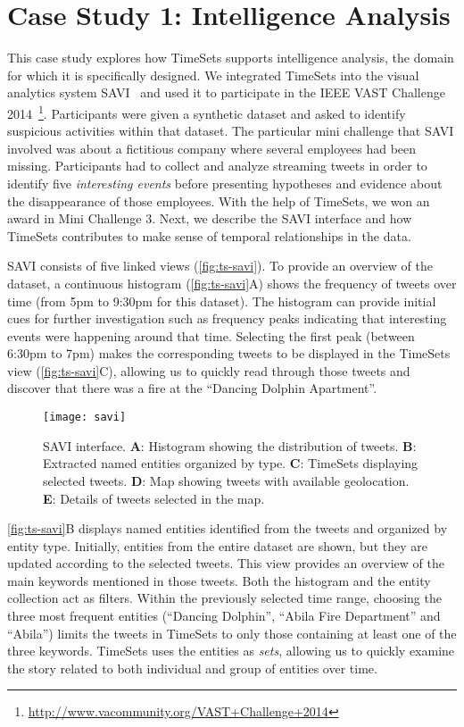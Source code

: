 \section{Case Study 1: Intelligence Analysis}
\label{sub:ts-vast}
This case study explores how TimeSets supports intelligence analysis, the domain for which it is specifically designed. We integrated TimeSets into the visual analytics system SAVI~\cite{Xu2014} and used it to participate in the IEEE VAST Challenge 2014~\footnote{\url{http://www.vacommunity.org/VAST+Challenge+2014}}. Participants were given a synthetic dataset and asked to identify suspicious activities within that dataset. The particular mini challenge that SAVI involved was about a fictitious company where several employees had been missing. Participants had to collect and analyze streaming tweets in order to identify five \emph{interesting events} before presenting hypotheses and evidence about the disappearance of those employees. With the help of TimeSets, we won an award in Mini Challenge 3. Next, we describe the SAVI interface and how TimeSets contributes to make sense of temporal relationships in the data.

SAVI consists of five linked views (\autoref{fig:ts-savi}). To provide an overview of the dataset, a continuous histogram (\autoref{fig:ts-savi}A) shows the frequency of tweets over time (from 5pm to 9:30pm for this dataset). The histogram can provide initial cues for further investigation such as frequency peaks indicating that interesting events were happening around that time. Selecting the first peak (between 6:30pm to 7pm) makes the corresponding tweets to be displayed in the TimeSets view (\autoref{fig:ts-savi}C), allowing us to quickly read through those tweets and discover that there was a fire at the ``Dancing Dolphin Apartment''.

\begin{figure}[p]
	\centering
	\texttt{[image: savi]}
	\caption[SAVI interface]{SAVI interface. \textbf{A}: Histogram showing the distribution of tweets. \textbf{B}: Extracted named entities organized by type. \textbf{C}: TimeSets displaying selected tweets. \textbf{D}: Map showing tweets with available geolocation. \textbf{E}: Details of tweets selected in the map.}
	\label{fig:ts-savi}
\end{figure}

\autoref{fig:ts-savi}B displays named entities identified from the tweets and organized by entity type. Initially, entities from the entire dataset are shown, but they are updated according to the selected tweets. This view provides an overview of the main keywords mentioned in those tweets. Both the histogram and the entity collection act as filters. Within the previously selected time range, choosing the three most frequent entities (``Dancing Dolphin'', ``Abila Fire Department'' and ``Abila'') limits the tweets in TimeSets to only those containing at least one of the three keywords. TimeSets uses the entities as \emph{sets}, allowing us to quickly examine the story related to both individual and group of entities over time.

